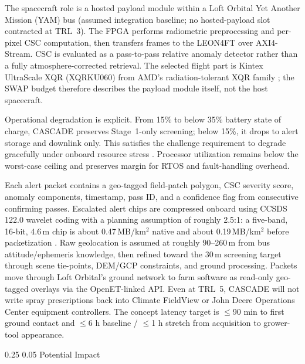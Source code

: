 \documentclass[11pt,letterpaper]{article}
\makeatletter
\renewcommand\section{\@startsection{section}{1}{\z@}
  {0.25\baselineskip}
  {0.05\baselineskip}
  {\normalfont\large\bfseries}}
\makeatother
\begin{document}
The spacecraft role is a hosted payload module within a Loft Orbital Yet Another Mission (YAM) bus (assumed integration baseline; no hosted-payload slot contracted at TRL~3). The FPGA performs radiometric preprocessing and per-pixel CSC computation, then transfers frames to the LEON4FT over AXI4-Stream. CSC is evaluated as a pass-to-pass relative anomaly detector rather than a fully atmosphere-corrected retrieval. The selected flight part is Kintex UltraScale XQR (XQRKU060) from AMD's radiation-tolerant XQR family \cite{amd-xqr}; the SWAP budget therefore describes the payload module itself, not the host spacecraft.

Operational degradation is explicit. From 15\% to below 35\% battery state of charge, CASCADE preserves Stage~1-only screening; below 15\%, it drops to alert storage and downlink only. This satisfies the challenge requirement to degrade gracefully under onboard resource stress \cite{nasa-challenge-brief}. Processor utilization remains below the worst-case ceiling and preserves margin for RTOS and fault-handling overhead.

Each alert packet contains a geo-tagged field-patch polygon, CSC severity score, anomaly components, timestamp, pass ID, and a confidence flag from consecutive confirming passes. Escalated alert chips are compressed onboard using CCSDS 122.0 wavelet coding with a planning assumption of roughly 2.5:1: a five-band, 16-bit, 4.6\,m chip is about 0.47\,MB/km$^2$ native and about 0.19\,MB/km$^2$ before packetization \cite{esa-cwicom}. Raw geolocation is assumed at roughly 90--260\,m from bus attitude/ephemeris knowledge, then refined toward the 30\,m screening target through scene tie-points, DEM/GCP constraints, and ground processing. Packets move through Loft Orbital's ground network to farm software as read-only geo-tagged overlays via the OpenET-linked API. Even at TRL~5, CASCADE will not write spray prescriptions back into Climate FieldView or John Deere Operations Center equipment controllers. The concept latency target is $\leq$90 min to first ground contact and $\leq$6 h baseline / $\leq$1 h stretch from acquisition to grower-tool appearance.

\section{Potential Impact}
\label{sec:impact}
\end{document}

